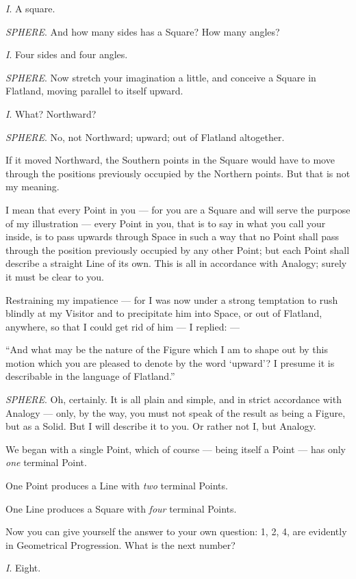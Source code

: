 \documentclass[10pt, kindle, oneside]{kindle}
\begin{document}
\emph{I}. A square.

\emph{SPHERE}. And how many sides has a Square? How many angles?

\emph{I}. Four sides and four angles.

\emph{SPHERE}. Now stretch your imagination a little, and conceive a Square in
Flatland, moving parallel to itself upward.

\emph{I}. What? Northward?

\emph{SPHERE}. No, not Northward; upward; out of Flatland altogether.

If it moved Northward, the Southern points in the Square would have to move
through the positions previously occupied by the Northern points. But that is
not my meaning.

I mean that every Point in you --- for you are a Square and will serve the
purpose of my illustration --- every Point in you, that is to say in what you
call your inside, is to pass upwards through Space in such a way that no Point
shall pass through the position previously occupied by any other Point; but
each Point shall describe a straight Line of its own. This is all in
accordance with Analogy; surely it must be clear to you.

Restraining my impatience --- for I was now under a strong temptation to rush
blindly at my Visitor and to precipitate him into Space, or out of Flatland,
anywhere, so that I could get rid of him --- I replied: ---

``And what may be the nature of the Figure which I am to shape out by this
motion which you are pleased to denote by the word `upward'? I presume it is
describable in the language of Flatland.''

\emph{SPHERE}. Oh, certainly. It is all plain and simple, and in strict accordance
with Analogy --- only, by the way, you must not speak of the result as being a
Figure, but as a Solid. But I will describe it to you. Or rather not I, but
Analogy.

We began with a single Point, which of course --- being itself a Point --- has
only \emph{one} terminal Point.

One Point produces a Line with \emph{two} terminal Points.

One Line produces a Square with \emph{four} terminal Points.

Now you can give yourself the answer to your own question: 1, 2, 4, are
evidently in Geometrical Progression. What is the next number?

\emph{I}. Eight.
\end{document}
